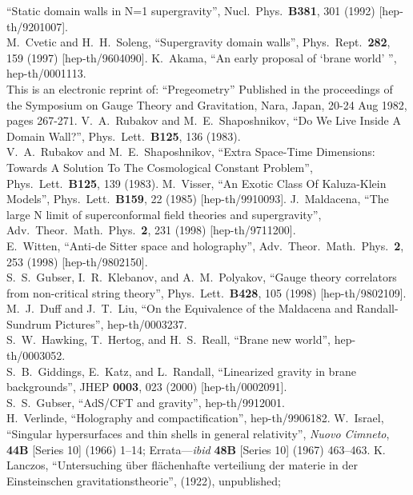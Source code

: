 \documentclass[a4paper,12pt]{article}
\begin{document}
\begin{thebibliography}{99}
``Static domain walls in N=1 supergravity'',
Nucl.\ Phys.\  {\bf B381}, 301 (1992)
[hep-th/9201007].
\\
M.~Cvetic and H.~H.~Soleng,
``Supergravity domain walls'',
Phys.\ Rept.\  {\bf 282}, 159 (1997)
[hep-th/9604090].
K.~Akama,
``An early proposal of `brane world' '',
hep-th/0001113.\\
This is an electronic reprint of: ``Pregeometry''
Published in the proceedings of the 
Symposium on Gauge Theory and Gravitation, Nara, Japan, 
20-24 Aug 1982, pages 267-271. 
V.~A.~Rubakov and M.~E.~Shaposhnikov,
``Do We Live Inside A Domain Wall?'',
Phys.\ Lett.\  {\bf B125}, 136 (1983).
\\
V.~A.~Rubakov and M.~E.~Shaposhnikov,
``Extra Space-Time Dimensions: Towards A Solution To The 
Cosmological Constant Problem'',
Phys.\ Lett.\  {\bf B125}, 139 (1983).
M.~Visser,
``An Exotic Class Of Kaluza-Klein Models'',
Phys.\ Lett.\  {\bf B159}, 22 (1985)
[hep-th/9910093].
J.~Maldacena,
``The large N limit of superconformal field theories and supergravity'',
Adv.\ Theor.\ Math.\ Phys.\  {\bf 2}, 231 (1998)
[hep-th/9711200].
\\
E.~Witten,
``Anti-de Sitter space and holography'',
Adv.\ Theor.\ Math.\ Phys.\  {\bf 2}, 253 (1998)
[hep-th/9802150].
\\
S.~S.~Gubser, I.~R.~Klebanov, and A.~M.~Polyakov,
``Gauge theory correlators from non-critical string theory'',
Phys.\ Lett.\  {\bf B428}, 105 (1998)
[hep-th/9802109].
M.~J.~Duff and J.~T.~Liu,
``On the Equivalence of the Maldacena and Randall-Sundrum Pictures'',
hep-th/0003237.
\\
S.~W.~Hawking, T.~Hertog, and H.~S.~Reall,
``Brane new world'',
hep-th/0003052.
\\
S.~B.~Giddings, E.~Katz, and L.~Randall,
``Linearized gravity in brane backgrounds'',
JHEP {\bf 0003}, 023 (2000)
[hep-th/0002091].
\\
S.~S.~Gubser,
``AdS/CFT and gravity'',
hep-th/9912001.
\\
H.~Verlinde,
``Holography and compactification'',
hep-th/9906182.
W.~Israel,
``Singular hypersurfaces and thin shells in general relativity'',
{\em Nuovo Cimneto}, {\bf 44B} [Series 10] (1966) 1--14; 
Errata---{\em ibid} {\bf 48B} [Series 10] (1967) 463--463.
K. Lanczos,
``Untersuching \"uber fl\"achenhafte verteiliung der materie in der 
Einsteinschen gravitationstheorie'', (1922), unpublished;
\\

\end{thebibliography}
\end{document}
